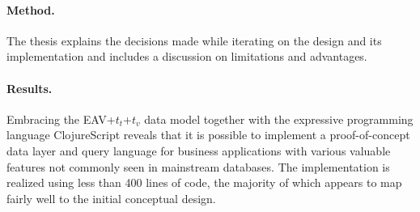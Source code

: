 \paragraph{Method.}
The thesis explains the decisions made while iterating on the design and its implementation and includes a discussion on limitations and advantages.

\paragraph{Results.}
Embracing the EAV+$t_t$+$t_v$ data model together with the expressive programming language ClojureScript \cite{hickey2008clojure} reveals that it is possible to implement a proof-of-concept data layer and query language for business applications with various valuable features not commonly seen in mainstream databases. The implementation is realized using less than 400 lines of code, the majority of which appears to map fairly well to the initial conceptual design.
